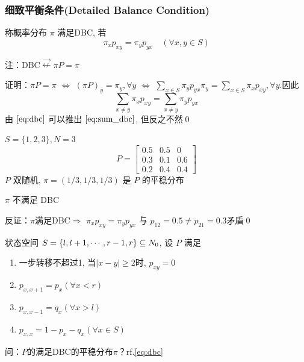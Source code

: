 \subsubsection{细致平衡条件(Detailed Balance Condition)}

\begin{definition}
    称概率分布 $\pi$ 满足DBC, 若
    \begin{equation}
        \pi_xp_{xy}=\pi_y p_{yx}\quad (\forall x,y\in S)
    \label{eq:dbc}
    \end{equation}
\end{definition}

注：DBC$\stackrel{\rightarrow}{\nleftarrow} \pi P=\pi$

证明：$\pi P=\pi$ $\Leftrightarrow$ $ (\pi P)_y=\pi_y,\forall y$ $\Leftrightarrow$ $\sum_{x\in S}\pi_y p_{yx}\pi_y=\sum_{x\in S}\pi_x p_{xy},\forall y$.因此
\begin{equation}
    \sum_{x\neq y}\pi_x p_{xy}=\sum_{x\neq y}\pi_y p_{yx}
    \label{eq:sum_dbc}
\end{equation}
由 $\eqref{eq:dbc}$ 可以推出 $\eqref{eq:sum_dbc}$, 但反之不然\qed

\begin{example}[DBC反例]
    $S=\{1,2,3\},N=3$
    \[
    P=\begin{bmatrix}
        0.5 & 0.5 & 0\\
        0.3 & 0.1 & 0.6\\
        0.2 & 0.4 & 0.4
    \end{bmatrix}
    \]
    $P$ 双随机, $\pi=(1/3,1/3,1/3)$ 是 $P$ 的平稳分布
    \begin{claim}
        $\pi$ 不满足 DBC
    \end{claim}
    反证：$\pi$满足DBC$\Rightarrow$ $\pi_x p_{xy}=\pi_y p_{yx}$ 与 $p_{12}=0.5\neq p_{21}=0.3$矛盾\qed
\end{example}

\begin{example}[生灭链]
    状态空间 $S=\{l,l+1,\cdots,r-1,r\}\subseteq N_0$, 设 $P$ 满足
    \begin{enumerate}
        \item 一步转移不超过1, 当$|x-y|\geq 2$时, $p_{xy}=0$
        \item $p_{x,x+1}=p_x(\forall x<r)$
        \item $p_{x,x-1}=q_x(\forall x>l)$
        \item $p_{x,x}=1-p_x-q_x(\forall x\in S)$
    \end{enumerate}
    问：$P$的满足DBC的平稳分布$\pi$？rf.\eqref{eq:dbc}
\end{example}


